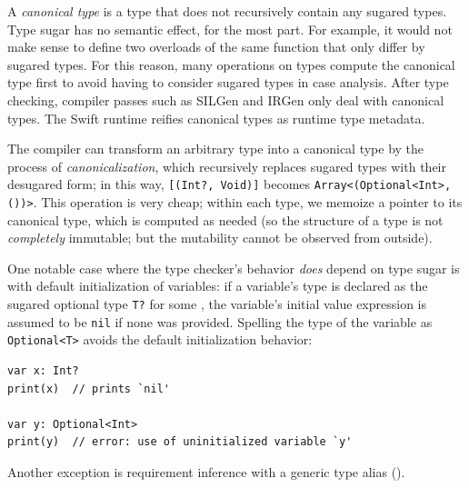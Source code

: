 \documentclass[../generics]{subfiles}
\begin{document}
A \emph{canonical type} is a type that does not recursively contain any sugared types. Type sugar has no semantic effect, for the most part. For example, it would not make sense to define two overloads of the same function that only differ by sugared types. For this reason, many operations on types compute the canonical type first to avoid having to consider sugared types in case analysis. After type checking, compiler passes such as SILGen and IRGen only deal with canonical types. The Swift runtime reifies canonical types as runtime type metadata.

The compiler can transform an arbitrary type into a canonical type by the process of \emph{canonicalization}, which recursively replaces sugared types with their desugared form; in this way, \texttt{[(Int?, Void)]} becomes \verb|Array<(Optional<Int>, ())>|. This operation is very cheap; within each type, we memoize a pointer to its canonical type, which is computed as needed (so the structure of a type is not \emph{completely} immutable; but the mutability cannot be observed from outside).

One notable case where the type checker's behavior \emph{does} depend on type sugar is with default initialization of variables: if a variable's type is declared as the sugared optional type \texttt{T?} for some \tT, the variable's initial value expression is assumed to be \texttt{nil} if none was provided. Spelling the type of the variable as \texttt{Optional<T>} avoids the default initialization behavior:
\begin{Verbatim}
var x: Int?
print(x)  // prints `nil'

var y: Optional<Int>
print(y)  // error: use of uninitialized variable `y'
\end{Verbatim}

Another exception is requirement inference with a generic type alias ().
\end{document}
